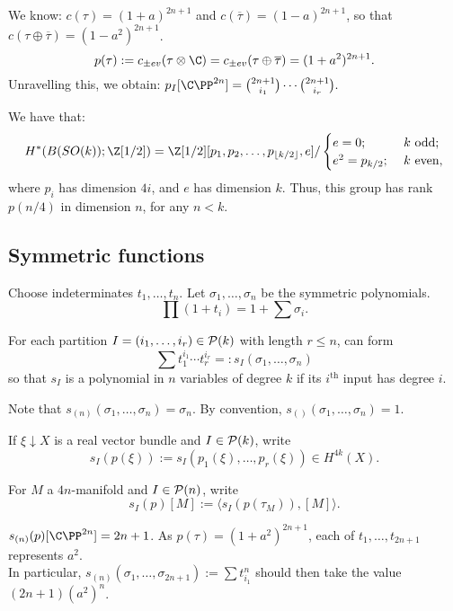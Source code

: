 \documentclass[11pt]{article}
\begin{document}
\begin{SignatureThmTalk}
\begin{itemise}
We know:
$c(\tau)=(1+a)^{2n+1}$ and $c(\overline\tau)=(1-a)^{2n+1}$, so that $c(\tau\oplus\overline\tau)=(1-a^2)^{2n+1}$.
\[p(\tau):=c_{\pm ev}(\tau\otimes\C)=c_{\pm ev}(\tau\oplus\overline\tau)=(1+a^2)^{2n+1}.\]
Unravelling this, we obtain:
$p_I[\CP^{2n}]={2n+1\choose i_1}\cdots{2n+1\choose i_r}.$
\item We have that:
\[H^*(B(SO(k));\Z[1/2])=\Z[1/2][p_1,p_2,\ldots,p_{\lfloor k/2\rfloor},e]/
\begin{cases}
e=0;&\ \text{$k$ odd};\\
e^2=p_{k/2};&\ \text{$k$ even},
\end{cases}\]
where $p_i$ has dimension $4i$, and $e$ has dimension $k$. Thus, this group has rank $p(n/4)$ in dimension $n$, for any $n<k$.

\end{itemise}

\pagebreak
\subsection*{Symmetric functions}
\begin{itemise}
\item Choose indeterminates $t_1,\ldots,t_n$. Let $\sigma_1,\ldots,\sigma_n$ be the symmetric polynomials.
\[\prod(1+t_i)=1+\sum\sigma_i.\]
\item For each partition $I=(i_1,\ldots,i_r)\in\mathcal{P}(k)$ with length $r\leq n$, can form
\[\sum t_1^{i_1}\cdots t_r^{i_r}=:s_I(\sigma_1,\ldots,\sigma_n)\]
so that $s_I$ is a polynomial in $n$ variables of degree $k$ if its $i^\text{th}$ input has degree $i$.
\item Note that $s_{(n)}(\sigma_1,\ldots,\sigma_n)=\sigma_n$. By convention, $s_{()}(\sigma_1,\ldots,\sigma_n)=1$.
\item If $\xi\downarrow X$ is a real vector bundle and $I\in\mathcal{P}(k)$, write 
\[s_I(p(\xi)):=s_I(p_1(\xi),\ldots,p_r(\xi))\in H^{4k}(X).\]
\item For $M$ a $4n$-manifold and $I\in\mathcal{P}(n)$, write
\[s_I(p)[M]:=\langle s_I(p(\tau_M)),[M]\rangle.\]
\item $s_{(n)}(p)[\CP^{2n}]=2n+1$. As $p(\tau)=(1+a^2)^{2n+1}$, each of $t_1,\ldots,t_{2n+1}$  represents $a^2$.\\
In particular, $s_{(n)}(\sigma_1,\ldots,\sigma_{2n+1}):=\sum t^n_{i_1}$ should then take the value $(2n+1)(a^2)^n$.
\end{itemise}


\end{SignatureThmTalk}
\end{document}
